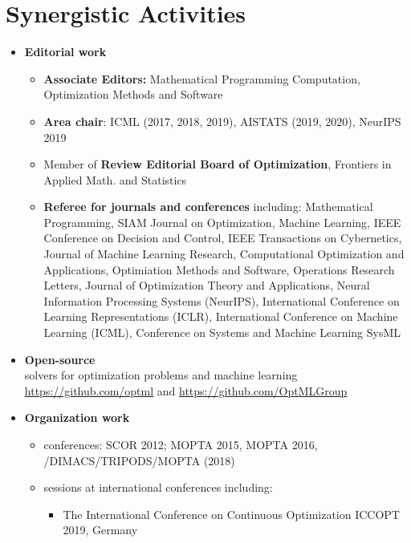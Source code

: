 \documentclass[11pt]{article}
\newcommand{\0}{ {\bf 0}}
\begin{document}
\section*{\color{color1}Synergistic Activities\vskip-8pt}


\begin{itemize}[noitemsep,topsep=0pt]
\setlength\itemsep{0.1em}
\item {\bf\color{color1}Editorial work}\small
\begin{itemize}[noitemsep,topsep=0pt]
\setlength\itemsep{0.1em}
\item  
{\bf Associate Editors:} Mathematical Programming Computation, Optimization Methods and Software
\item 
{\bf Area chair}: ICML (2017, 2018, 2019), AISTATS (2019, 2020), NeurIPS 2019 
\item 
Member of {\bf Review Editorial Board of Optimization}, Frontiers in Applied Math. and Statistics 
\item {\bf Referee for journals and conferences} including:  
Mathematical Programming,
SIAM Journal on Optimization,
Machine Learning,
IEEE Conference on Decision and Control,
IEEE Transactions on Cybernetics,
Journal of Machine Learning Research,
Computational Optimization and Applications,
Optimiation Methods and Software,
Operations Research Letters,
Journal of Optimization Theory and Applications,
Neural Information Processing Systems (NeurIPS),
International Conference on Learning Representations (ICLR),
International Conference on Machine Learning (ICML), Conference on Systems and Machine Learning {SysML} 
\end{itemize}
\normalsize 
\item {\bf\color{color1}Open-source}\\solvers for optimization problems and machine learning 
\url{https://github.com/optml}
and
\url{https://github.com/OptMLGroup}
\item 
{\bf\color{color1}Organization work}
\begin{itemize}[noitemsep,topsep=0pt]
\item conferences: SCOR 2012; MOPTA 2015, MOPTA 2016, /DIMACS/TRIPODS/MOPTA (2018) \item sessions at international conferences including:
\begin{itemize}  [noitemsep,topsep=0pt]
\setlength\itemsep{0.1em}

\small 
\item The International Conference on Continuous Optimization ICCOPT 2019, Germany



\end{itemize}
\end{itemize}
\end{itemize}
\end{document}
